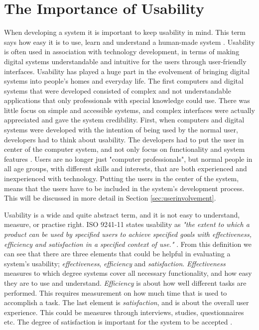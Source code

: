 \section{The Importance of Usability}
\label{sec:usability}
When developing a system it is important to keep usability in mind. This term says how easy it is to use, learn and understand a human-made system \cite{mmi}. Usability is often used in association with technology development, in terms of making digital systems understandable and intuitive for the users through user-friendly interfaces. Usability has played a huge part in the evolvement of bringing digital systems into people's homes and everyday life. The first computers and digital systems that were developed consisted of complex and not understandable applications that only professionals with special knowledge could use. There was little focus on simple and accessible systems, and complex interfaces were actually appreciated and gave the system credibility. First, when computers and digital systems were developed with the intention of being used by the normal user, developers had to think about usability. The developers had to put the user in center of the computer system, and not only focus on functionality and system features \cite{mmi}. Users are no longer just "computer professionals", but normal people in all age groups, with different skills and interests, that are both experienced and inexperienced with technology. Putting the users in the center of the system, means that the users have to be included in the system's development process. This will be discussed in more detail in Section \ref{sec:userinvolvement}.  

Usability is a wide and quite abstract term, and it is not easy to understand, measure, or practise right. ISO 9241-11 states usability as \emph{"the extent to which a product can be used by specified users to achieve specified goals with effectiveness, efficiency and satisfaction in a specified context of use."} \cite{jokela2003standard}. From this definition we can see that there are three elements that could be helpful in evaluating a system's usability; \emph{effectiveness}, \emph{efficiency} and \emph{satisfaction}. \emph{Effectiveness} measures to which degree systems cover all necessary functionality, and how easy they are to use and understand. \emph{Efficiency} is about how well different tasks are performed. This requires measurement on how much time that is used to accomplish a task. The last element is \emph{satisfaction}, and is about the overall user experience. This could be measures through interviews, studies, questionnaires etc. The degree of satisfaction is important for the system to be accepted \cite{mmi}. 

